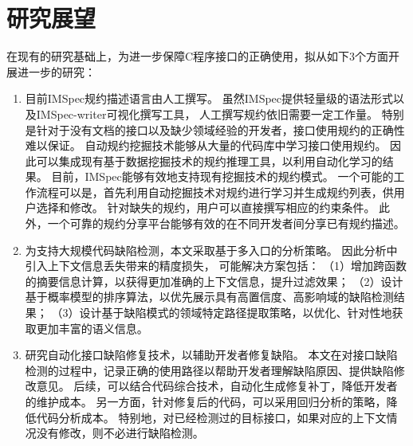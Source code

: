 \section{研究展望}
\label{sec:5.2}
在现有的研究基础上，为进一步保障C程序接口的正确使用，拟从如下3个方面开展进一步的研究：
\begin{enumerate}
	\item 目前IMSpec规约描述语言由人工撰写。
	虽然IMSpec提供轻量级的语法形式以及IMSpec-writer可视化撰写工具，
	人工撰写规约依旧需要一定工作量。
	特别是针对于没有文档的接口以及缺少领域经验的开发者，接口使用规约的正确性难以保证。
	自动规约挖掘技术能够从大量的代码库中学习接口使用规约。
	因此可以集成现有基于数据挖掘技术的规约推理工具，以利用自动化学习的结果。
	目前，IMSpec能够有效地支持现有挖掘技术的规约模式。
	一个可能的工作流程可以是，首先利用自动挖掘技术对规约进行学习并生成规约列表，供用户选择和修改。
	针对缺失的规约，用户可以直接撰写相应的约束条件。
	此外，一个可靠的规约分享平台能够有效的在不同开发者间分享已有规约描述。
	
	\item 为支持大规模代码缺陷检测，本文采取基于多入口的分析策略。
	因此分析中引入上下文信息丢失带来的精度损失，
	可能解决方案包括：
	（1）增加跨函数的摘要信息计算，以获得更加准确的上下文信息，提升过滤效果；
	（2）设计基于概率模型的排序算法，以优先展示具有高置信度、高影响域的缺陷检测结果；
	（3）设计基于缺陷模式的领域特定路径提取策略，以优化、针对性地获取更加丰富的语义信息。
	
	
	\item 研究自动化接口缺陷修复技术，以辅助开发者修复缺陷。
	本文在对接口缺陷检测的过程中，记录正确的使用路径以帮助开发者理解缺陷原因、提供缺陷修改意见。
	后续，可以结合代码综合技术，自动化生成修复补丁，降低开发者的维护成本。
	另一方面，针对修复后的代码，可以采用回归分析的策略，降低代码分析成本。
	特别地，对已经检测过的目标接口，如果对应的上下文情况没有修改，则不必进行缺陷检测。
\end{enumerate}

